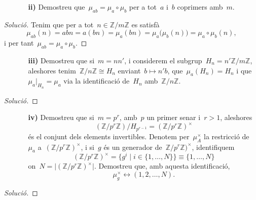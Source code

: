 \documentclass[a4paper]{article}
\newcommand{\ZZ}{\mathbb{Z}}
\newenvironment{solution}{
    \renewcommand\qedsymbol{\ensuremath{\lozenge}}
    \begin{proof}[Solució]
        }{
    \end{proof}
}
\begin{document}
\begin{enumerate}
    \item[] \begin{enumerate}
        \item[\textbf{ii)}] Demostreu que~\(\mu_{ab} = \mu_{a}\circ\mu_{b}\) per
            a tot~\(a\) i~\(b\) coprimers amb~\(m\).
    \end{enumerate}
\end{enumerate}

\begin{solution}
Tenim que per a tot~\(n\in\ZZ/m\ZZ\) es satisfà
\[
    \mu_{ab}(n)
    = abn
    = a(bn)
    = \mu_{a}(bn)
    = \mu_{a}\bigl(\mu_{b}(n)\bigr)
    = \mu_{a}\circ\mu_{b}(n),
\]
i per tant~\(\mu_{ab} = \mu_{a}\circ\mu_{b}\).
\end{solution}

\begin{enumerate}
    \item[] \begin{enumerate}
        \item[\textbf{iii)}] Demostreu que si~\(m=nn'\),
            i considerem el subgrup~\(H_{n}=n'\ZZ/m\ZZ\),
            aleshores tenim~\(\ZZ/n\ZZ \cong H_{n}\)
            enviant~\(b\mapsto n'b\),
            que~\(\mu_{a}(H_{n})=H_{n}\)
            i que~\(\mu_{a}\rvert_{H_{n}}=\mu_{a}\)
            via la identificació de~\(H_{n}\)
            amb~\(\ZZ/n\ZZ\).
    \end{enumerate}
\end{enumerate}

\begin{solution}
\end{solution}

\begin{enumerate}
    \item[] \begin{enumerate}
        \item[\textbf{iv)}] Demostreu que si~\(m=p^{r}\),
            amb~\(p\) un primer senar
            i~\(r>1\), aleshores
            \[
                (\ZZ/p^{r}\ZZ)/H_{p^{r-1}} = (\ZZ/p^{r}\ZZ)^{\times}
            \]
            és el conjunt dels elements invertibles.
            Denotem per~\(\mu_{A}^{\times}\)
            la restricció de~\(\mu_{a}\) a~\((\ZZ/p^{r}\ZZ)^{\times}\),
            i si~\(g\) és un generador de~\(\ZZ/p^{r}\ZZ)^{\times}\),
            identifiquem
            \[
                (\ZZ/p^{r}\ZZ)^{\times}
                =
                \{ g^{i} \mid i\in \{1,\dots,N\}\}
                \equiv
                \{1,\dots,N\}
            \]
            on~\(N = \lvert(\ZZ/p^{r}\ZZ)^{\times}\rvert\).
            Demostreu que, amb aquesta identificació,
            \[
                \mu_{g}^{\times} \leftrightarrow (1,2,\dots,N).
            \]
    \end{enumerate}
\end{enumerate}

\begin{solution}
\end{solution}
\end{document}
